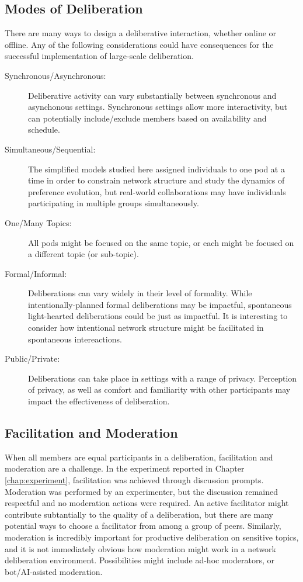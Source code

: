 \subsection{Modes of Deliberation}
There are many ways to design a deliberative interaction, whether online or offline. Any of the following considerations could have consequences for the successful implementation of large-scale deliberation.
\begin{description}
	\item[Synchronous/Asynchronous:] Deliberative activity can vary substantially between synchronous and asynchonous settings. Synchronous settings allow more interactivity, but can potentially include/exclude members based on availability and schedule.
	\item[Simultaneous/Sequential:] The simplified models studied here assigned individuals to one pod at a time in order to constrain network structure and study the dynamics of preference evolution, but real-world collaborations may have individuals participating in multiple groups simultaneously.
	\item[One/Many Topics:] All pods might be focused on the same topic, or each might be focused on a different topic (or sub-topic).
	\item[Formal/Informal:] Deliberations can vary widely in their level of formality. While intentionally-planned formal deliberations may be impactful, spontaneous light-hearted deliberations could be just as impactful. It is interesting to consider how intentional network structure might be facilitated in spontaneous intereactions.
	\item[Public/Private:] Deliberations can take place in settings with a range of privacy. Perception of privacy, as well as comfort and familiarity with other participants may impact the effectiveness of deliberation.
\end{description}

\subsection{Facilitation and Moderation}
When all members are equal participants in a deliberation, facilitation and moderation are
a challenge.
In the experiment reported in Chapter \ref{chap:experiment}, facilitation was achieved
through discussion prompts.
Moderation was performed by an experimenter, but the discussion remained respectful and no
moderation actions were required.
An active facilitator might contribute subtantially to the quality of a deliberation,
but there are many potential ways to choose a facilitator from among a group of peers.
Similarly, moderation is incredibly important for productive deliberation on sensitive
topics, and it is not immediately obvious how moderation might work in a network
deliberation environment.
Possibilities might include ad-hoc moderators, or bot/AI-asisted moderation.


